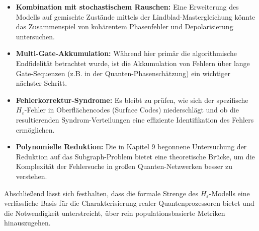 ﻿\documentclass[11pt,a4paper]{article}
\theoremstyle{definition}
\newcommand{\Heps}{H_{\!\varepsilon}}
\begin{document}
\begin{itemize}[leftmargin=*]
    \item \textbf{Kombination mit stochastischem Rauschen:} Eine Erweiterung des Modells auf gemischte Zustände mittels der Lindblad-Mastergleichung könnte das Zusammenspiel von kohärentem Phasenfehler und Depolarisierung untersuchen.
    \item \textbf{Multi-Gate-Akkumulation:} Während hier primär die algorithmische Endfidelität betrachtet wurde, ist die Akkumulation von Fehlern über lange Gate-Sequenzen (z.B. in der Quanten-Phasenschätzung) ein wichtiger nächster Schritt.
    \item \textbf{Fehlerkorrektur-Syndrome:} Es bleibt zu prüfen, wie sich der spezifische $\Heps$-Fehler in Oberflächencodes (Surface Codes) niederschlägt und ob die resultierenden Syndrom-Verteilungen eine effiziente Identifikation des Fehlers ermöglichen.
    \item \textbf{Polynomielle Reduktion:} Die in Kapitel 9 begonnene Untersuchung der Reduktion auf das Subgraph-Problem bietet eine theoretische Brücke, um die Komplexität der Fehlersuche in großen Quanten-Netzwerken besser zu verstehen.
\end{itemize}

Abschließend lässt sich festhalten, dass die formale Strenge des $\Heps$-Modells eine verlässliche Basis für die Charakterisierung realer Quantenprozessoren bietet und die Notwendigkeit unterstreicht, über rein populationsbasierte Metriken hinauszugehen.
\end{document}
